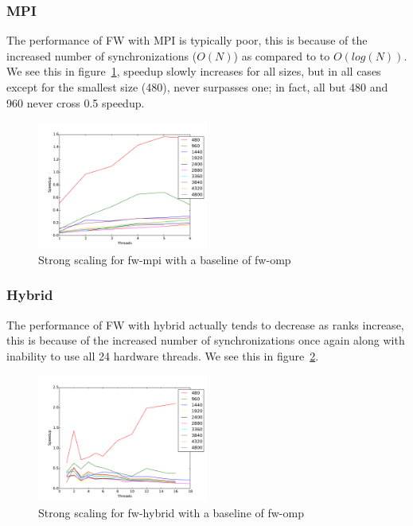 \subsubsection{MPI}

The performance of FW with MPI is typically poor, this is because of the
increased number of synchronizations ($O(N)$) as compared to to $O(log(N))$. We
see this in figure~\ref{strong-fw-mpi}, speedup slowly increases for all sizes,
but in all cases except for the smallest size (480), never surpasses one; in
fact, all but 480 and 960 never cross 0.5 speedup.

\begin{figure}[ht]
\centering
\includegraphics[width=0.5\textwidth]{plots/strong_fw-mpi_baseline-fw-omp--1.pdf}
\caption{Strong scaling for fw-mpi with a baseline of fw-omp}
\label{strong-fw-mpi}
\end{figure}

\subsubsection{Hybrid}

The performance of FW with hybrid actually tends to decrease as ranks increase,
this is because of the increased number of synchronizations once again along
with inability to use all 24 hardware threads. We see this in
figure~\ref{strong-fw-hybrid}.

\begin{figure}[ht]
\centering
\includegraphics[width=0.5\textwidth]{plots/strong_fw-hybrid_baseline-fw-omp--1.pdf}
\caption{Strong scaling for fw-hybrid with a baseline of fw-omp}
\label{strong-fw-hybrid}
\end{figure}
